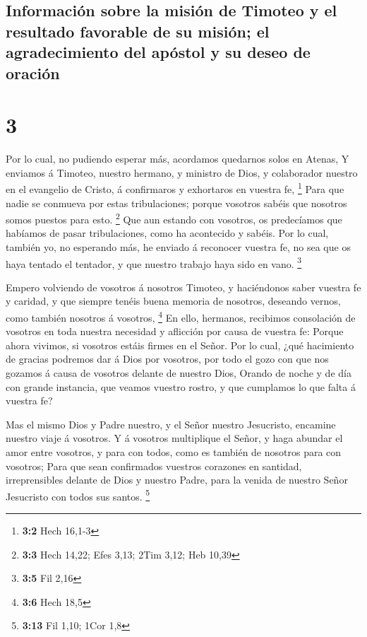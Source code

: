 \hypertarget{informaciuxf3n-sobre-la-misiuxf3n-de-timoteo-y-el-resultado-favorable-de-su-misiuxf3n-el-agradecimiento-del-apuxf3stol-y-su-deseo-de-oraciuxf3n}{%
\subsection{Información sobre la misión de Timoteo y el resultado
favorable de su misión; el agradecimiento del apóstol y su deseo de
oración}\label{informaciuxf3n-sobre-la-misiuxf3n-de-timoteo-y-el-resultado-favorable-de-su-misiuxf3n-el-agradecimiento-del-apuxf3stol-y-su-deseo-de-oraciuxf3n}}

\hypertarget{section-2}{%
\section{3}\label{section-2}}

 Por lo cual, no pudiendo esperar más, acordamos quedarnos
solos en Atenas,  Y enviamos á Timoteo, nuestro hermano, y
ministro de Dios, y colaborador nuestro en el evangelio de Cristo, á
confirmaros y exhortaros en vuestra fe, \footnote{\textbf{3:2} Hech
  16,1-3}  Para que nadie se conmueva por estas
tribulaciones; porque vosotros sabéis que nosotros somos puestos para
esto. \footnote{\textbf{3:3} Hech 14,22; Efes 3,13; 2Tim 3,12; Heb 10,39}
 Que aun estando con vosotros, os predecíamos que habíamos
de pasar tribulaciones, como ha acontecido y sabéis.  Por lo
cual, también yo, no esperando más, he enviado á reconocer vuestra fe,
no sea que os haya tentado el tentador, y que nuestro trabajo haya sido
en vano. \footnote{\textbf{3:5} Fil 2,16}

 Empero volviendo de vosotros á nosotros Timoteo, y
haciéndonos saber vuestra fe y caridad, y que siempre tenéis buena
memoria de nosotros, deseando vernos, como también nosotros á vosotros,
\footnote{\textbf{3:6} Hech 18,5}  En ello, hermanos,
recibimos consolación de vosotros en toda nuestra necesidad y aflicción
por causa de vuestra fe:  Porque ahora vivimos, si vosotros
estáis firmes en el Señor.  Por lo cual, ¿qué hacimiento de
gracias podremos dar á Dios por vosotros, por todo el gozo con que nos
gozamos á causa de vosotros delante de nuestro Dios, 
Orando de noche y de día con grande instancia, que veamos vuestro
rostro, y que cumplamos lo que falta á vuestra fe?

 Mas el mismo Dios y Padre nuestro, y el Señor nuestro
Jesucristo, encamine nuestro viaje á vosotros.  Y á
vosotros multiplique el Señor, y haga abundar el amor entre vosotros, y
para con todos, como es también de nosotros para con vosotros;
 Para que sean confirmados vuestros corazones en santidad,
irreprensibles delante de Dios y nuestro Padre, para la venida de
nuestro Señor Jesucristo con todos sus santos. \footnote{\textbf{3:13}
  Fil 1,10; 1Cor 1,8}

